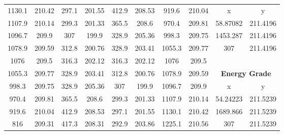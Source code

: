 \begin{center}
\begin{tabular}{|cccc||cccc||cc|}
    \cline{9-10}
    1130.1   & 210.42                  & 297.1 & 201.55                       & 412.9 & 208.53                             & 919.6  & 210.04                                & x        & y                                  \\
    1107.9   & 210.14                  & 299.3 & 201.33                       & 365.5 & 208.6                              & 970.4  & 209.81                                & 58.87082 & 211.4196                           \\
    1096.7   & 209.9                   & 307   & 199.9                        & 328.9 & 205.36                             & 998.3  & 209.75                                & 1453.287 & 211.4196                           \\
    1078.9   & 209.59                  & 312.8 & 200.76                       & 328.9 & 203.41                             & 1055.3 & 209.77                                & 307      & 211.4196                           \\
    1076     & 209.5                   & 316.3 & 202.12                       & 316.3 & 202.12                             & 1076   & 209.5                                 &          &                                    \\
    1055.3   & 209.77                  & 328.9 & 203.41                       & 312.8 & 200.76                             & 1078.9 & 209.59                                & \multicolumn{2}{c|}{\textbf{Energy Grade}}    \\ 
    \cline{9-10}
    998.3    & 209.75                  & 328.9 & 205.36                       & 307   & 199.9                              & 1096.7 & 209.9                                 & x        & y                                  \\
    970.4    & 209.81                  & 365.5 & 208.6                        & 299.3 & 201.33                             & 1107.9 & 210.14                                & 54.24223 & 211.5239                           \\
    919.6    & 210.04                  & 412.9 & 208.53                       & 297.1 & 201.55                             & 1130.1 & 210.42                                & 1689.866 & 211.5239                           \\
    816      & 209.31                  & 417.3 & 208.31                       & 292.9 & 203.86                             & 1225.1 & 210.56                                & 307      & 211.5239                           \\

\end{tabular}
\end{center}
